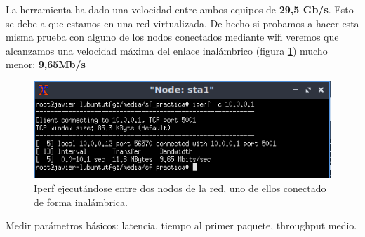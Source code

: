 La herramienta ha dado una velocidad entre ambos equipos de \textbf{29,5 Gb/s}. Esto se debe a que estamos en una red virtualizada. De hecho si probamos a hacer esta misma prueba con alguno de los nodos conectados mediante wifi veremos que alcanzamos una velocidad máxima del enlace inalámbrico (figura \ref{fig:iperf-wifi}) mucho menor: \textbf{9,65Mb/s}

\begin{figure}[!h]
    \centering
    \includegraphics[width=\textwidth]{imagenes/figuras/iperf-wifi.png}
    \caption{Iperf ejecutándose entre dos nodos de la red, uno de ellos conectado de forma inalámbrica.}
    \label{fig:iperf-wifi}
\end{figure}

Medir parámetros básicos: latencia, tiempo al primer paquete, throughput medio.
